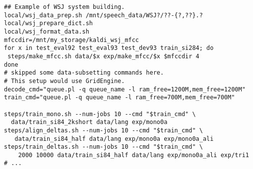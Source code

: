 \documentclass{article}
\begin{document}
\begin{verbatim}
## Example of WSJ system building.
local/wsj_data_prep.sh /mnt/speech_data/WSJ?/??-{?,??}.?
local/wsj_prepare_dict.sh
local/wsj_format_data.sh
mfccdir=/mnt/my_storage/kaldi_wsj_mfcc
for x in test_eval92 test_eval93 test_dev93 train_si284; do 
 steps/make_mfcc.sh data/$x exp/make_mfcc/$x $mfccdir 4
done
# skipped some data-subsetting commands here.
# This setup would use GridEngine.
decode_cmd="queue.pl -q queue_name -l ram_free=1200M,mem_free=1200M"
train_cmd="queue.pl -q queue_name -l ram_free=700M,mem_free=700M"

steps/train_mono.sh --num-jobs 10 --cmd "$train_cmd" \
  data/train_si84_2kshort data/lang exp/mono0a
steps/align_deltas.sh --num-jobs 10 --cmd "$train_cmd" \
   data/train_si84_half data/lang exp/mono0a exp/mono0a_ali
steps/train_deltas.sh --num-jobs 10 --cmd "$train_cmd" \
    2000 10000 data/train_si84_half data/lang exp/mono0a_ali exp/tri1
# ... 
\end{verbatim}
\vspace{0.4in}
\end{document}
